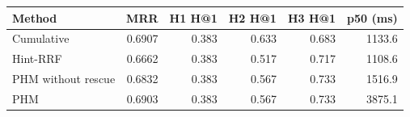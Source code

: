 \begin{tabular}{lrrrrr}
\hline
Method & MRR & H1 H@1 & H2 H@1 & H3 H@1 & p50 (ms) \\
\hline
Cumulative & 0.6907 & 0.383 & 0.633 & 0.683 & 1133.6 \\
Hint-RRF & 0.6662 & 0.383 & 0.517 & 0.717 & 1108.6 \\
PHM without rescue & 0.6832 & 0.383 & 0.567 & 0.733 & 1516.9 \\
PHM & 0.6903 & 0.383 & 0.567 & 0.733 & 3875.1 \\
\hline
\end{tabular}
